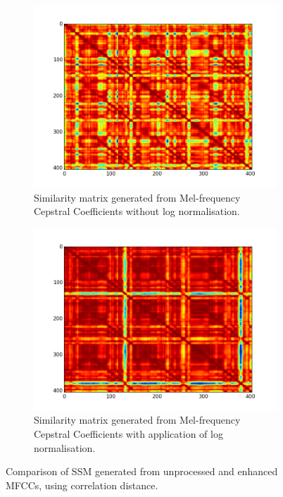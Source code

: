 \begin{figure}
        \centering
        \begin{subfigure}[b]{0.47\textwidth}
                \includegraphics[width=\textwidth]{Figures/mfcc_no_log_sync}
                \caption{Similarity matrix generated from Mel-frequency Cepstral Coefficients without log normalisation.}
                \label{fig:unMFCC}
        \end{subfigure}%
        \begin{subfigure}[b]{0.47\textwidth}
                \includegraphics[width=\textwidth]{Figures/mfcc_ssm_synched}
                \caption{Similarity matrix generated from Mel-frequency Cepstral Coefficients with application of log normalisation.}
                \label{fig:synMFCC}
        \end{subfigure}
          \caption{Comparison of SSM generated from unprocessed and enhanced MFCCs, using correlation distance.}
        \label{fig:MFCCcomparison}
\end{figure}

